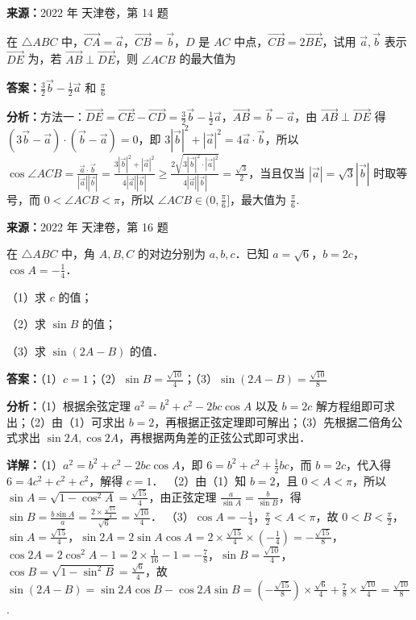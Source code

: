 \begin{question}[points=5]
\textbf{来源：}2022 年 天津卷，第 14 题\par
在 $\triangle ABC$ 中，$\overrightarrow{CA}=\vec{a}$，$\overrightarrow{CB}=\vec{b}$，$D$ 是 $AC$ 中点，$\overrightarrow{CB}=2\overrightarrow{BE}$，试用 $\vec{a},\vec{b}$ 表示 $\overrightarrow{DE}$ 为，若 $\overrightarrow{AB}\perp\overrightarrow{DE}$，则 $\angle ACB$ 的最大值为
\begin{solution}
\textbf{答案：}$\frac{3}{2}\vec{b}-\frac{1}{2}\vec{a}$ 和 $\frac{\pi}{6}$

\textbf{分析：}方法一：$\overrightarrow{DE}=\overrightarrow{CE}-\overrightarrow{CD}=\frac{3}{2}\vec{b}-\frac{1}{2}\vec{a}$，$\overrightarrow{AB}=\vec{b}-\vec{a}$，由 $\overrightarrow{AB}\perp\overrightarrow{DE}$ 得 $(3\vec{b}-\vec{a})\cdot(\vec{b}-\vec{a})=0$，即 $3|\vec{b}|^2+|\vec{a}|^2=4\vec{a}\cdot\vec{b}$，所以 $\cos\angle ACB=\frac{\vec{a}\cdot\vec{b}}{|\vec{a}||\vec{b}|}=\frac{3|\vec{b}|^2+|\vec{a}|^2}{4|\vec{a}||\vec{b}|}\ge\frac{2\sqrt{3|\vec{b}|^2\cdot|\vec{a}|^2}}{4|\vec{a}||\vec{b}|}=\frac{\sqrt{3}}{2}$，当且仅当 $|\vec{a}|=\sqrt{3}|\vec{b}|$ 时取等号，而 $0<\angle ACB<\pi$，所以 $\angle ACB\in(0,\frac{\pi}{6}]$，最大值为 $\frac{\pi}{6}$.
\end{solution}
\end{question}

\begin{question}[points=15]
\textbf{来源：}2022 年 天津卷，第 16 题\par
在 $\triangle ABC$ 中，角 $A,B,C$ 的对边分别为 $a,b,c$．已知 $a=\sqrt{6}$，$b=2c$，$\cos A=-\frac{1}{4}$．

（1）求 $c$ 的值；

（2）求 $\sin B$ 的值；

（3）求 $\sin(2A-B)$ 的值．
\begin{solution}
\textbf{答案：}（1）$c=1$；（2）$\sin B=\frac{\sqrt{10}}{4}$；（3）$\sin(2A-B)=\frac{\sqrt{10}}{8}$

\textbf{分析：}（1）根据余弦定理 $a^2=b^2+c^2-2bc\cos A$ 以及 $b=2c$ 解方程组即可求出；（2）由（1）可求出 $b=2$，再根据正弦定理即可解出；（3）先根据二倍角公式求出 $\sin2A,\cos2A$，再根据两角差的正弦公式即可求出．

\textbf{详解：}（1）$a^2=b^2+c^2-2bc\cos A$，即 $6=b^2+c^2+\frac{1}{2}bc$，而 $b=2c$，代入得 $6=4c^2+c^2+c^2$，解得 $c=1$．
（2）由（1）知 $b=2$，且 $0<A<\pi$，所以 $\sin A=\sqrt{1-\cos^2 A}=\frac{\sqrt{15}}{4}$，由正弦定理 $\frac{a}{\sin A}=\frac{b}{\sin B}$，得 $\sin B=\frac{b\sin A}{a}=\frac{2\times\frac{\sqrt{15}}{4}}{\sqrt{6}}=\frac{\sqrt{10}}{4}$．
（3）$\cos A=-\frac{1}{4}$，$\frac{\pi}{2}<A<\pi$，故 $0<B<\frac{\pi}{2}$，$\sin A=\frac{\sqrt{15}}{4}$，$\sin2A=2\sin A\cos A=2\times\frac{\sqrt{15}}{4}\times(-\frac{1}{4})=-\frac{\sqrt{15}}{8}$，$\cos2A=2\cos^2A-1=2\times\frac{1}{16}-1=-\frac{7}{8}$，$\sin B=\frac{\sqrt{10}}{4}$，$\cos B=\sqrt{1-\sin^2B}=\frac{\sqrt{6}}{4}$，故 $\sin(2A-B)=\sin2A\cos B-\cos2A\sin B=(-\frac{\sqrt{15}}{8})\times\frac{\sqrt{6}}{4}+\frac{7}{8}\times\frac{\sqrt{10}}{4}=\frac{\sqrt{10}}{8}$.
\end{solution}
\end{question}

